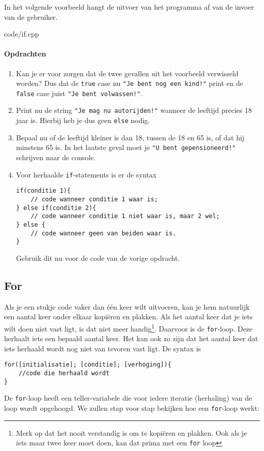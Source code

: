 \documentclass[12pt,a4paper]{article}
\newcommand{\code}{}
\newcommand{\icode}{\lstinline}
\begin{document}
In het volgende voorbeeld hangt de uitvoer van het programma af van de invoer van de gebruiker.

\code{code/if.cpp}

\paragraph{Opdrachten}
\begin{enumerate}
		\item
		Kan je er voor zorgen dat de twee gevallen uit het voorbeeld verwisseld worden? Dus dat de \icode{true} case nu \icode{"Je bent nog een kind!"} print en de \icode{false} case juist \icode{"Je bent volwassen!"}.
		\item
			Print nu de string \icode{"Je mag nu autorijden!"} wanneer de leeftijd precies 18 jaar is. Hierbij heb je dus geen \icode{else} nodig.
		\item
			Bepaal nu of de leeftijd kleiner is dan 18, tussen de 18 en 65 is, of dat hij minstens 65 is. In het laatste geval moet je \icode{"U bent gepensioneerd!"} schrijven naar de console.
		\item
			Voor herhaalde \icode{if}-statements is er de syntax
\begin{lstlisting}
if(conditie 1){
	// code wanneer conditie 1 waar is;
} else if(conditie 2){
	// code wanneer conditie 1 niet waar is, maar 2 wel;
} else {
	// code wanneer geen van beiden waar is.
}
\end{lstlisting}
Gebruik dit nu voor de code van de vorige opdracht.
\end{enumerate}


\subsection{For}
Als je een stukje code vaker dan \'e\'en keer wilt uitvoeren, kan je hem natuurlijk een aantal keer onder elkaar kopi\"eren en plakken. Als het aantal keer dat je iets wilt doen niet vast ligt, is dat niet meer handig\footnote{Merk op dat het nooit verstandig is om te kopi\"eren en plakken. Ook als je iets maar twee keer moet doen, kan dat prima met een \icode{for} loop}. Daarvoor is de \icode{for}-loop.
Deze herhaalt iets een bepaald aantal keer. Het kan ook zo zijn dat het aantal keer dat iets herhaald wordt nog niet van tevoren vast ligt. De syntax is 
\begin{lstlisting}
for([initialisatie]; [conditie]; [verhoging]){
	//code die herhaald wordt
}
\end{lstlisting}
De \icode{for}-loop heeft een teller-variabele die voor iedere iteratie (herhaling) van de loop wordt opgehoogd. We zullen stap voor stap bekijken hoe een \icode{for}-loop werkt:
\end{document}
